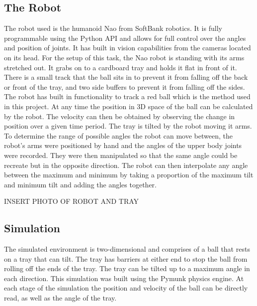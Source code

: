 \documentclass[12pt,a4paper]{article}
\begin{document}
\subsection{The Robot}
The robot used is the humanoid Nao from SoftBank robotics. It is fully programmable using the Python API and allows for full control over the angles and position of joints. It has built in vision capabilities from the cameras located on its head. For the setup of this task, the Nao robot is standing with its arms stretched out. It grabs on to a cardboard tray and holds it flat in front of it. There is a small track that the ball sits in to prevent it from falling off the back or front of the tray, and two side buffers to prevent it from falling off the sides. The robot has built in functionality to track a red ball which is the method used in this project. At any time the position in 3D space of the ball can be calculated by the robot. The velocity can then be obtained by observing the change in position over a given time period. The tray is tilted by the robot moving it arms. To determine the range of possible angles the robot can move between, the robot's arms were positioned by hand and the angles of the upper body joints were recorded. They were then manipulated so that the same angle could be recreate but in the opposite direction. The robot can then interpolate any angle between the maximum and minimum by taking a proportion of the maximum tilt and minimum tilt and adding the angles together.

INSERT PHOTO OF ROBOT AND TRAY

\subsection{Simulation}
The simulated environment is two-dimensional and comprises of a ball that rests on a tray that can tilt. The tray has barriers at either end to stop the ball from rolling off the ends of the tray. The tray can be tilted up to a maximum angle in each direction. This simulation was built using the Pymunk physics engine. At each stage of the simulation the position and velocity of the ball can be directly read, as well as the angle of the tray.  
\end{document}
